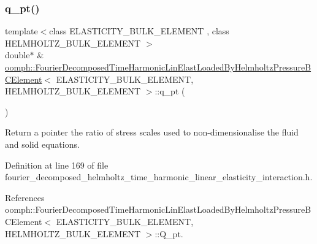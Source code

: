 \mbox{\label{classoomph_1_1FourierDecomposedTimeHarmonicLinElastLoadedByHelmholtzPressureBCElement_a3495996a8cdf7bb6e5ff5e3d9dcafa7e}} 
\subsubsection{\texorpdfstring{q\+\_\+pt()}{q\_pt()}}
{\footnotesize\ttfamily template$<$class E\+L\+A\+S\+T\+I\+C\+I\+T\+Y\+\_\+\+B\+U\+L\+K\+\_\+\+E\+L\+E\+M\+E\+NT , class H\+E\+L\+M\+H\+O\+L\+T\+Z\+\_\+\+B\+U\+L\+K\+\_\+\+E\+L\+E\+M\+E\+NT $>$ \\
double$\ast$ \& \hyperlink{classoomph_1_1FourierDecomposedTimeHarmonicLinElastLoadedByHelmholtzPressureBCElement}{oomph\+::\+Fourier\+Decomposed\+Time\+Harmonic\+Lin\+Elast\+Loaded\+By\+Helmholtz\+Pressure\+B\+C\+Element}$<$ E\+L\+A\+S\+T\+I\+C\+I\+T\+Y\+\_\+\+B\+U\+L\+K\+\_\+\+E\+L\+E\+M\+E\+NT, H\+E\+L\+M\+H\+O\+L\+T\+Z\+\_\+\+B\+U\+L\+K\+\_\+\+E\+L\+E\+M\+E\+NT $>$\+::q\+\_\+pt (\begin{DoxyParamCaption}{ }\end{DoxyParamCaption})\hspace{0.3cm}{\ttfamily [inline]}}



Return a pointer the ratio of stress scales used to non-\/dimensionalise the fluid and solid equations. 



Definition at line 169 of file fourier\+\_\+decomposed\+\_\+helmholtz\+\_\+time\+\_\+harmonic\+\_\+linear\+\_\+elasticity\+\_\+interaction.\+h.



References oomph\+::\+Fourier\+Decomposed\+Time\+Harmonic\+Lin\+Elast\+Loaded\+By\+Helmholtz\+Pressure\+B\+C\+Element$<$ E\+L\+A\+S\+T\+I\+C\+I\+T\+Y\+\_\+\+B\+U\+L\+K\+\_\+\+E\+L\+E\+M\+E\+N\+T, H\+E\+L\+M\+H\+O\+L\+T\+Z\+\_\+\+B\+U\+L\+K\+\_\+\+E\+L\+E\+M\+E\+N\+T $>$\+::\+Q\+\_\+pt.



